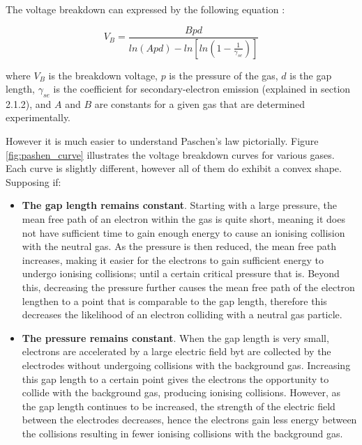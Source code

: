 The voltage breakdown can expressed by the following equation \cite{Lieberman2005}:

\begin{equation}
	V_B = \frac{B p d}{ln(A p d) - ln[ln(1-\frac{1}{\gamma_{se}})]}
\end{equation}

where $V_B$ is the breakdown voltage, $p$ is the pressure of the gas, $d$ is the gap length, $\gamma_{se}$ is the coefficient for secondary-electron emission (explained in section 2.1.2), and $A$ and $B$ are constants for a given gas that are determined experimentally.

However it is much easier to understand Paschen's law pictorially. Figure \ref{fig:pashen_curve} illustrates the voltage breakdown curves for various gases. Each curve is slightly different, however all of them do exhibit a convex shape. Supposing if:

\begin{itemize}
    \item \textbf{The gap length remains constant}. Starting with a large pressure, the mean free path of an electron within the gas is quite short, meaning it does not have sufficient time to gain enough energy to cause an ionising collision with the neutral gas. As the pressure is then reduced, the mean free path increases, making it easier for the electrons to gain sufficient energy to undergo ionising collisions; until a certain critical pressure that is. Beyond this, decreasing the pressure further causes the mean free path of the electron lengthen to a point that is comparable to the gap length, therefore this decreases the likelihood of an electron colliding with a neutral gas particle.
    \item \textbf{The pressure remains constant}. When the gap length is very small, electrons are accelerated by a large electric field byt are collected by the electrodes without undergoing collisions with the background gas. Increasing this gap length to a certain point gives the electrons the opportunity to collide with the background gas, producing ionising collisions. However, as the gap length continues to be increased, the strength of the electric field between the electrodes decreases, hence the electrons gain less energy between the collisions resulting in fewer ionising collisions with the background gas.
\end{itemize}

